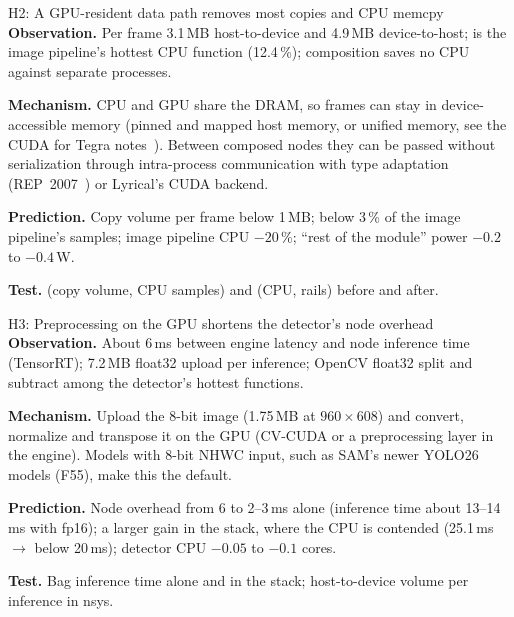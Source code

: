 \documentclass[11pt,a4paper]{article}
\newcommand{\finding}[1]{\textsf{\small F#1}}
\begin{document}
\begin{hypbox}{H2: A GPU-resident data path removes most copies and CPU memcpy}
\textbf{Observation.} Per frame 3.1\,MB host-to-device and 4.9\,MB device-to-host;  is the image pipeline's
hottest CPU function (12.4\,\%); composition saves no CPU against separate processes.
\par\textbf{Mechanism.} CPU and GPU share the DRAM, so frames can stay in device-accessible memory (pinned and mapped
host memory, or unified memory, see the CUDA for Tegra notes~\cite{cuda-tegra}). Between composed nodes they can be
passed without serialization through intra-process communication with type adaptation (REP~2007~\cite{rep2007}) or
Lyrical's  CUDA backend.
\par\textbf{Prediction.} Copy volume per frame below 1\,MB;  below 3\,\% of the image pipeline's samples;
image pipeline CPU $-20$\,\%; \enquote{rest of the module} power $-0.2$ to $-0.4$\,W.
\par\textbf{Test.}  (copy volume, CPU samples) and  (CPU, rails) before and after.
\end{hypbox}

\begin{hypbox}{H3: Preprocessing on the GPU shortens the detector's node overhead}
\textbf{Observation.} About 6\,ms between engine latency and node inference time (TensorRT); 7.2\,MB float32 upload per
inference; OpenCV float32 split and subtract among the detector's hottest functions.
\par\textbf{Mechanism.} Upload the 8-bit image (1.75\,MB at $960\times608$) and convert, normalize and transpose it on the
GPU (CV-CUDA or a preprocessing layer in the engine). Models with 8-bit NHWC input, such as SAM's newer YOLO26
models (\finding{55}), make this the default.
\par\textbf{Prediction.} Node overhead from 6 to 2--3\,ms alone (inference time about 13--14\,ms with fp16); a larger gain in
the stack, where the CPU is contended (25.1\,ms $\to$ below 20\,ms); detector CPU $-0.05$ to $-0.1$ cores.
\par\textbf{Test.} Bag inference time alone and in the stack; host-to-device volume per inference in nsys.
\end{hypbox}
\end{document}
